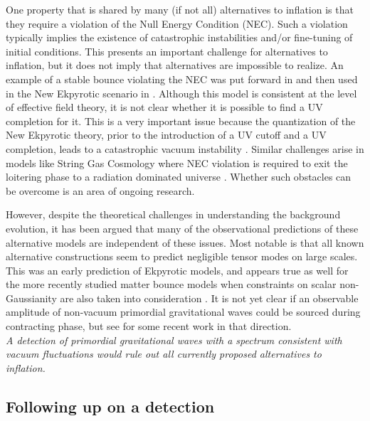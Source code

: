 One property that is shared by many (if not all) alternatives to inflation is that they require a violation of the Null Energy Condition (NEC). 
Such a violation typically implies the existence of catastrophic instabilities and/or fine-tuning of initial conditions.
This presents an important challenge for alternatives to inflation, but it does not imply that alternatives are impossible to realize. 
An example of a stable bounce violating the NEC was put forward in \cite{Creminelli:2006xe} and then
used in the New Ekpyrotic scenario in
\cite{Buchbinder:2007ad,Creminelli:2007aq}. Although this model is consistent at the level of effective field theory, it is not clear whether it is possible to find a UV completion for it. 
This is a very important issue because the quantization of the New Ekpyrotic theory, prior to the introduction of a UV cutoff and a UV completion, leads to a catastrophic vacuum instability \cite{Kallosh:2007ad}.  Similar challenges arise in models like String Gas Cosmology where NEC violation is required to exit the loitering phase to a radiation dominated universe
\cite{Brustein:1994kw,Kaloper:1995ey,Kaloper:1995tu,Kaloper:2007pw}.  Whether such obstacles can be overcome is an area of ongoing research.

However, despite the theoretical challenges in understanding the background evolution, it has been argued that many 
of the observational predictions of these alternative models are independent of these issues.
Most notable is that all known alternative constructions seem to predict negligible tensor modes on large scales.
This was an early prediction of Ekpyrotic models, and appears true as well for the more recently 
studied matter bounce models when constraints on scalar non-Gaussianity are also taken into consideration \cite{Quintin:2015rta}. It is not yet clear if an observable amplitude of non-vacuum primordial gravitational waves could be sourced during contracting phase, but see \cite{Ben-Dayan:2016iks} for some recent work in that direction. \\




{\it A detection of primordial gravitational waves with a spectrum consistent with vacuum fluctuations would rule out all currently proposed alternatives to inflation.}



\subsection{Following up on a detection}
\label{sec:beyond_r}

